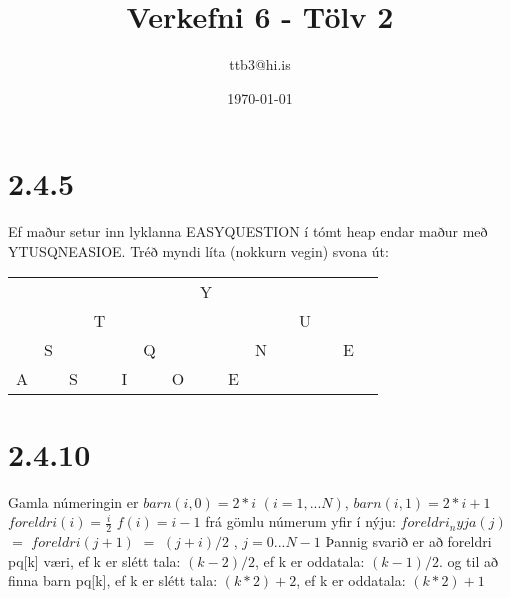 \documentclass{article}
\title{Verkefni 6 - Tölv 2}
\author{ttb3@hi.is}
\date{\today}
\begin{document}
\maketitle 

\section*{2.4.5}
Ef maður setur inn lyklanna EASYQUESTION í tómt heap endar maður með YTUSQNEASIOE. Tréð myndi líta (nokkurn vegin) svona út:

\begin{tabular}{ccccccccccccccc}
    &&&&&&&Y&&&&&&&\\
    &&&T&&&&&&&&U&&&\\
    &S&&&&Q&&&&N&&&&E&\\
    A&&S&&I&&O&&E&&&&&&
\end{tabular}

\section*{2.4.10}


Gamla númeringin er $barn(i,0) = 2*i$ $(i=1,...N)$, $barn(i,1) = 2*i+1$ 
$foreldri(i)=\frac{i}{2}$ $f(i)=i-1$
frá gömlu númerum yfir í nýju: $foreldri_nyja(j)$ $=$ $foreldri(j+1)$ $=$ $(j+i)/2$ , $j=0...N-1$
Þannig svarið er að foreldri pq[k] væri, ef k er slétt tala: $(k-2)/2$, ef k er oddatala: $(k-1)/2$.
og til að finna barn pq[k], ef k er slétt tala: $(k*2)+2$, ef k er oddatala: $(k*2)+1$
\end{document}
